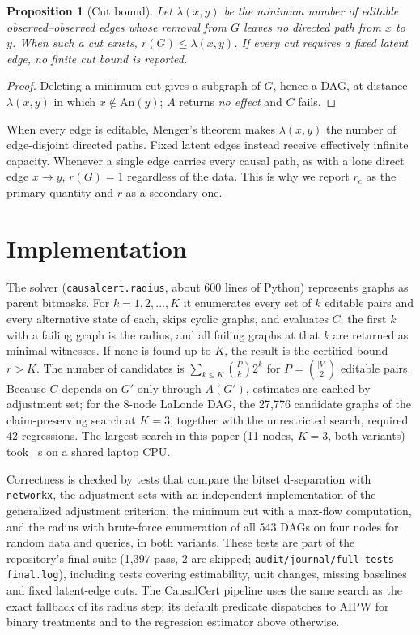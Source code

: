 \documentclass[11pt]{article}
\newtheorem{proposition}{Proposition}
\begin{document}
\begin{proposition}[Cut bound]
Let $\lambda(x,y)$ be the minimum number of editable observed--observed edges whose removal from $G$ leaves no directed path from $x$ to $y$. When such a cut exists, $r(G)\le\lambda(x,y)$. If every cut requires a fixed latent edge, no finite cut bound is reported.
\end{proposition}
\begin{proof}
Deleting a minimum cut gives a subgraph of $G$, hence a DAG, at distance $\lambda(x,y)$ in which $x\notin\mathrm{An}(y)$; $A$ returns \emph{no effect} and $C$ fails.
\end{proof}
When every edge is editable, Menger's theorem makes $\lambda(x,y)$ the number of edge-disjoint directed paths. Fixed latent edges instead receive effectively infinite capacity. Whenever a single edge carries every causal path, as with a lone direct edge $x\to y$, $r(G)=1$ regardless of the data. This is why we report $r_c$ as the primary quantity and $r$ as a secondary one.

\section{Implementation}\label{sec:impl}

The solver (\texttt{causalcert.radius}, about 600 lines of Python) represents graphs as parent bitmasks. For $k=1,2,\dots,K$ it enumerates every set of $k$ editable pairs and every alternative state of each, skips cyclic graphs, and evaluates $C$; the first $k$ with a failing graph is the radius, and all failing graphs at that $k$ are returned as minimal witnesses. If none is found up to $K$, the result is the certified bound $r>K$. The number of candidates is $\sum_{k\le K}\binom{P}{k}2^k$ for $P=\binom{|V|}{2}$ editable pairs. Because $C$ depends on $G'$ only through $A(G')$, estimates are cached by adjustment set; for the 8-node LaLonde DAG, the 27{,}776 candidate graphs of the claim-preserving search at $K=3$, together with the unrestricted search, required 42 regressions. The largest search in this paper (11 nodes, $K=3$, both variants) took \SachsMaxSec{}~s on a shared laptop CPU.

Correctness is checked by tests that compare the bitset d-separation with \texttt{networkx}, the adjustment sets with an independent implementation of the generalized adjustment criterion, the minimum cut with a max-flow computation, and the radius with brute-force enumeration of all 543 DAGs on four nodes for random data and queries, in both variants. These tests are part of the repository's final suite (1{,}397 pass, 2 are skipped; \texttt{audit/journal/full-tests-final.log}), including tests covering estimability, unit changes, missing baselines and fixed latent-edge cuts. The CausalCert pipeline uses the same search as the exact fallback of its radius step; its default predicate dispatches to AIPW for binary treatments and to the regression estimator above otherwise.
\end{document}
